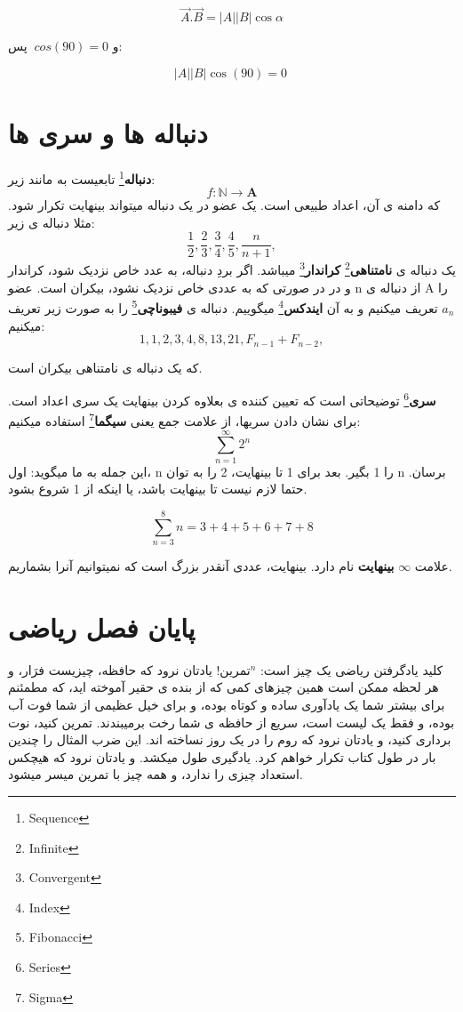 \documentclass[14pt,a4paper]{memoir}
\begin{document}
	 
	 
	 \[ \vec{A}.\vec{B} = |A||B|\cos \alpha \]
	 
	 و $ \ cos(90)  = 0$
	 پس:
	 
	 \[ |A||B|\cos (90) = 0 \ \]
	 
	 
	 
	 \section{دنباله ها و سری ها}\label{seqserie}
	 
	 \textbf{دنباله}\footnote{Sequence} تابعیست به مانند زیر:
	 \[ f: \mathbb{N} \longrightarrow \mathbf{A} \]
	 که دامنه ی آن، اعداد طبیعی است. یک عضو در یک دنباله میتواند بینهایت تکرار شود. مثلا دنباله ی زیر:
	 \[ \frac{1}{2}, \frac{2}{3}, \frac{3}{4}, \frac{4}{5}, \frac{n}{n+1}, \]
	 یک دنباله ی \textbf{نامتناهی}\footnote{Infinite} \textbf{کراندار}\footnote{Convergent} میباشد. اگر بردِ دنباله، به عدد خاص نزدیک شود، کراندار و در در صورتی که به عددی خاص نزدیک نشود، بیکران است.  عضو n از دنباله ی A را $ a_n $ تعریف میکنیم و به آن \textbf{ایندکس}\footnote{Index}  میگوییم.
	 دنباله ی \textbf{فیبوناچی}\footnote{Fibonacci} را به صورت زیر تعریف میکنیم:
	 \[ 1, 1, 2, 3, 4, 8, 13, 21, F_{n-1}+F_{n-2}, \]
	 
	 که یک دنباله ی نامتناهی بیکران است. 
	 
	 
	 \textbf{سری}\footnote{Series} توضیحاتی است که تعیین کننده ی بعلاوه کردن بینهایت یک سری اعداد است. برای نشان دادن سریها، از علامت جمع یعنی \textbf{سیگما}\footnote{Sigma} استفاده میکنیم:
	 \[  \sum_{n = 1}^{\infty} 2^n  \]
	 این جمله به ما میگوید: اول، n را 1 بگیر. بعد برای 1 تا بینهایت، 2 را به توان n برسان. حتما لازم نیست تا بینهایت باشد، یا اینکه از 1 شروع بشود.
	 
	 \[ \sum_{n = 3}^{8} n = 3+4+5+6+7+8 \]
	 
	 علامت $ \infty $ \textbf{بینهایت} نام دارد. بینهایت، عددی آنقدر بزرگ است که نمیتوانیم آنرا بشماریم. 
	 
\section{پایان فصل ریاضی}\label{mathend}

کلید یادگرفتن ریاضی یک چیز است: $  \text{تمرین}^n  $! یادتان نرود که حافظه، چیزیست فرَار، و هر لحظه ممکن است همین چیزهای کمی که از بنده ی حقیر آموخته اید، که مطمئنم برای بیشتر شما یک یادآوری ساده و کوتاه بوده، و برای خیل عظیمی از شما فوت آب بوده، و فقط یک لیست است، سریع از حافظه ی شما رخت برمیبندند. تمرین کنید، نوت برداری کنید، و یادتان نرود که روم را در یک روز نساخته اند. این ضرب المثال را چندین بار در طول کتاب تکرار خواهم کرد. یادگیری طول میکشد. و یادتان نرود که هیچکس استعداد چیزی را ندارد، و همه چیز با تمرین میسر میشود.
\end{document}
